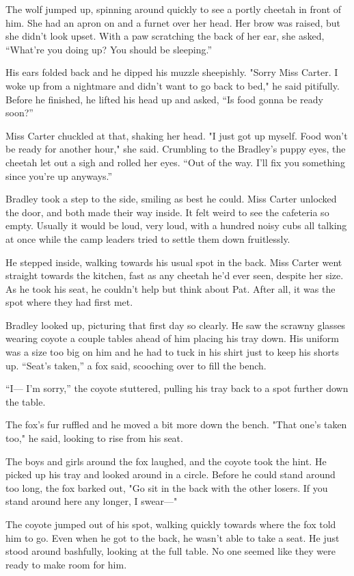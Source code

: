 The wolf jumped up, spinning around quickly to see a portly cheetah in
front of him. She had an apron on and a furnet over her head. Her brow
was raised, but she didn't look upset. With a paw scratching the back of
her ear, she asked, ``What're you doing up? You should be sleeping.''

His ears folded back and he dipped his muzzle sheepishly. "Sorry Miss
Carter. I woke up from a nightmare and didn't want to go back to bed,"
he said pitifully. Before he finished, he lifted his head up and asked,
``Is food gonna be ready soon?''

Miss Carter chuckled at that, shaking her head. "I just got up myself.
Food won't be ready for another hour," she said. Crumbling to the
Bradley's puppy eyes, the cheetah let out a sigh and rolled her eyes.
``Out of the way. I'll fix you something since you're up anyways.''

Bradley took a step to the side, smiling as best he could. Miss Carter
unlocked the door, and both made their way inside. It felt weird to see
the cafeteria so empty. Usually it would be loud, very loud, with a
hundred noisy cubs all talking at once while the camp leaders tried to
settle them down fruitlessly.

He stepped inside, walking towards his usual spot in the back. Miss
Carter went straight towards the kitchen, fast as any cheetah he'd ever
seen, despite her size. As he took his seat, he couldn't help but think
about Pat. After all, it was the spot where they had first met.

Bradley looked up, picturing that first day so clearly. He saw the
scrawny glasses wearing coyote a couple tables ahead of him placing his
tray down. His uniform was a size too big on him and he had to tuck in
his shirt just to keep his shorts up. ``Seat's taken,'' a fox said,
scooching over to fill the bench.

``I--- I'm sorry,'' the coyote stuttered, pulling his tray back to a spot
further down the table.

The fox's fur ruffled and he moved a bit more down the bench. "That
one's taken too," he said, looking to rise from his seat.

The boys and girls around the fox laughed, and the coyote took the hint.
He picked up his tray and looked around in a circle. Before he could
stand around too long, the fox barked out, "Go sit in the back with the
other losers. If you stand around here any longer, I swear---"

The coyote jumped out of his spot, walking quickly towards where the fox
told him to go. Even when he got to the back, he wasn't able to take a
seat. He just stood around bashfully, looking at the full table. No one
seemed like they were ready to make room for him.

